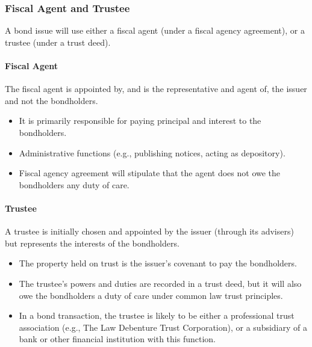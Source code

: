 \documentclass[
]{article}
\providecommand{\tightlist}{%
  \setlength{\itemsep}{0pt}\setlength{\parskip}{0pt}}
\begin{document}
\hypertarget{fiscal-agent-and-trustee}{%
\subsubsection{Fiscal Agent and
Trustee}\label{fiscal-agent-and-trustee}}

A bond issue will use either a fiscal agent (under a fiscal agency
agreement), or a trustee (under a trust deed).

\hypertarget{fiscal-agent}{%
\paragraph{Fiscal Agent}\label{fiscal-agent}}

The fiscal agent is appointed by, and is the representative and agent
of, the issuer and not the bondholders.

\begin{itemize}
\tightlist
\item
  It is primarily responsible for paying principal and interest to the
  bondholders.
\item
  Administrative functions (e.g., publishing notices, acting as
  depository).
\item
  Fiscal agency agreement will stipulate that the agent does not owe the
  bondholders any duty of care.
\end{itemize}

\hypertarget{trustee}{%
\paragraph{Trustee}\label{trustee}}

A trustee is initially chosen and appointed by the issuer (through its
advisers) but represents the interests of the bondholders.

\begin{itemize}
\tightlist
\item
  The property held on trust is the issuer's covenant to pay the
  bondholders.
\item
  The trustee's powers and duties are recorded in a trust deed, but it
  will also owe the bondholders a duty of care under common law trust
  principles.
\item
  In a bond transaction, the trustee is likely to be either a
  professional trust association (e.g., The Law Debenture Trust
  Corporation), or a subsidiary of a bank or other financial institution
  with this function.
\end{itemize}
\end{document}
